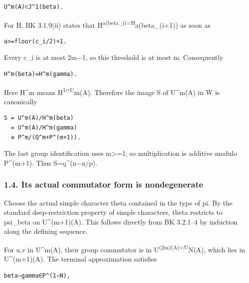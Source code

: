 \begin{Verbatim}[fontsize=\small,breaklines=true,breakanywhere=true]
U^m(A)⊂J^1(beta).
\end{Verbatim}

For H, BK 3.1.9(ii) states that
H\textsuperscript{a(beta\_i)=H}a(beta\_(i+1)) as soon as

\begin{Verbatim}[fontsize=\small,breaklines=true,breakanywhere=true]
a>=floor(c_i/2)+1.
\end{Verbatim}

Every c\_i is at most 2m−1, so this threshold is at most m. Consequently

\begin{Verbatim}[fontsize=\small,breaklines=true,breakanywhere=true]
H^m(beta)=H^m(gamma).
\end{Verbatim}

Here H\^{}m means H\textsuperscript{1∩U}m(A). Therefore the image S of
U\^{}m(A) in W is canonically

\begin{Verbatim}[fontsize=\small,breaklines=true,breakanywhere=true]
S = U^m(A)/H^m(beta)
  = U^m(A)/H^m(gamma)
  ≅ P^m/(Q^m+P^(m+1)).
\end{Verbatim}

The last group identification uses m\textgreater=1, so multiplication is
additive modulo P\^{}(m+1). Thus \textbar S\textbar=q\^{}(n−n/p).

\hypertarget{odd_capacity-its-actual-commutator-form-is-nondegenerate}{%
\subsubsection{1.4. Its actual commutator form is
nondegenerate}\label{odd_capacity-its-actual-commutator-form-is-nondegenerate}}

Choose the actual simple character theta contained in the type of pi. By
the standard deep-restriction property of simple characters, theta
restricts to psi\_beta on U\^{}(m+1)(A). This follows directly from BK
3.2.1--4 by induction along the defining sequence.

For u,v in U\^{}m(A), their group commutator is in
U\textsuperscript{(2m)(A)=U}N(A), which lies in U\^{}(m+1)(A). The
terminal approximation satisfies

\begin{Verbatim}[fontsize=\small,breaklines=true,breakanywhere=true]
beta−gamma∈P^(1−N),
\end{Verbatim}

